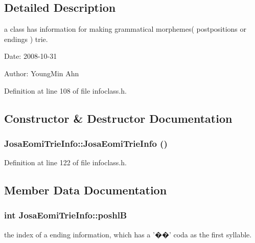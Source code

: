 \subsection{Detailed Description}
a class has information for making grammatical morphemes( postpositions or endings ) trie. 

\begin{Desc}
\item[Date:]2008-10-31 \end{Desc}
\begin{Desc}
\item[Author:]YoungMin Ahn \end{Desc}


Definition at line 108 of file infoclass.h.

\subsection{Constructor \& Destructor Documentation}
\hypertarget{classJosaEomiTrieInfo_9538e25d6044352f08462665e0473084}{
\subsubsection[{JosaEomiTrieInfo}]{\setlength{\rightskip}{0pt plus 5cm}JosaEomiTrieInfo::JosaEomiTrieInfo ()}}
\label{classJosaEomiTrieInfo_9538e25d6044352f08462665e0473084}




Definition at line 122 of file infoclass.h.

\subsection{Member Data Documentation}
\hypertarget{classJosaEomiTrieInfo_77a46726b05d28b368ee96f70103a81b}{
\subsubsection[{poshlB}]{\setlength{\rightskip}{0pt plus 5cm}int {\bf JosaEomiTrieInfo::poshlB}}}
\label{classJosaEomiTrieInfo_77a46726b05d28b368ee96f70103a81b}


the index of a ending information, which has a '��' coda as the first syllable. 



